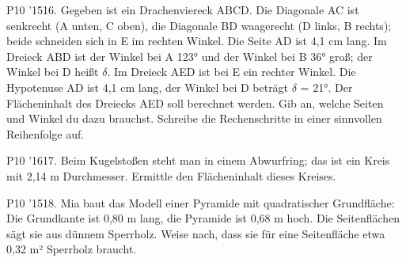 \documentclass[11pt]{article}
\begin{document}
\pfgruppe{}
\begin{pfaufg}{P10 ’15}{16.}{}
Gegeben ist ein Drachenviereck ABCD. Die Diagonale AC ist senkrecht (A unten, C oben), die Diagonale BD waagerecht (D links, B rechts); beide schneiden sich in E im rechten Winkel. Die Seite AD ist 4,1 cm lang. Im Dreieck ABD ist der Winkel bei A 123° und der Winkel bei B 36° groß; der Winkel bei D heißt $\delta$. Im Dreieck AED ist bei E ein rechter Winkel. Die Hypotenuse AD ist 4,1 cm lang, der Winkel bei D beträgt $\delta$ = 21°. Der Flächeninhalt des Dreiecks AED soll berechnet werden. Gib an, welche Seiten und Winkel du dazu brauchst. Schreibe die Rechenschritte in einer sinnvollen Reihenfolge auf.
\par\smallskip\noindent {}\par
{}
\end{pfaufg}
\pfgruppe{}
\begin{pfaufg}{P10 ’16}{17.}{}
Beim Kugelstoßen steht man in einem Abwurfring; das ist ein Kreis mit 2,14 m Durchmesser. Ermittle den Flächeninhalt dieses Kreises.
\end{pfaufg}
\pfgruppe{}
\begin{pfaufg}{P10 ’15}{18.}{}
Mia baut das Modell einer Pyramide mit quadratischer Grundfläche: Die Grundkante ist 0,80 m lang, die Pyramide ist 0,68 m hoch. Die Seitenflächen sägt sie aus dünnem Sperrholz. Weise nach, dass sie für eine Seitenfläche etwa 0,32 m² Sperrholz braucht.
\end{pfaufg}
\pfgruppe{}
\end{document}
